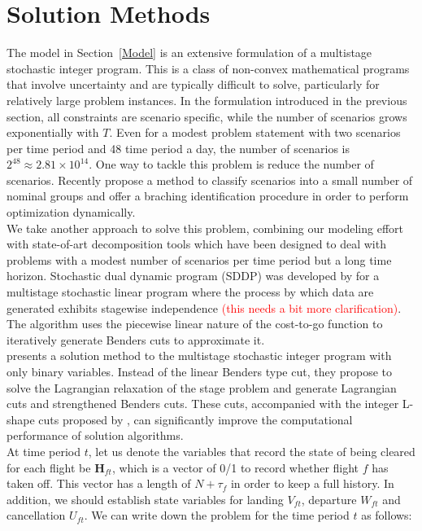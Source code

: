 \documentclass[12pt]{article}
\begin{document}
\section{Solution Methods}
	The model in Section~\ref{Model} is an extensive formulation of a multistage stochastic integer program. This is a class of non-convex mathematical programs that involve uncertainty and are typically difficult to solve, particularly for relatively large problem instances. In the formulation introduced in the previous section, all constraints are scenario specific, while the number of scenarios grows exponentially with \(T\). Even for a modest problem statement with two scenarios per time period and 48 time period a day, the number of scenarios is \(2^{48} \approx 2.81\times 10^{14}\). One way to tackle this problem is reduce the number of scenarios. Recently \cite{liu2008scenario} propose a method to classify scenarios into a small number of nominal groups and offer a braching identification procedure in order to perform optimization dynamically.\\
	\newline
	We take another approach to solve this problem, combining our modeling effort with state-of-art decomposition tools which have been designed to deal with problems with a modest number of scenarios per time period but a long time horizon. Stochastic dual dynamic program (SDDP) was developed by \cite{pereira1991multi} for a multistage stochastic linear program where the process by which data are generated exhibits stagewise independence \textcolor{red}{(this needs a bit more clarification)}. The algorithm uses the piecewise linear nature of the cost-to-go function to iteratively generate Benders cuts to approximate it.\\
	\newline \cite{zou2016nested} presents a solution method to the multistage stochastic integer program with only binary variables. Instead of the linear Benders type cut, they propose to solve the Lagrangian relaxation of the stage problem and generate Lagrangian cuts and strengthened Benders cuts. These cuts, accompanied with the integer L-shape cuts proposed by \cite{laporte1993integer}, can significantly improve the computational performance of solution algorithms.\\
	\newline At time period \(t\), let us denote the variables that record the state of being cleared for each flight be \(\mathbf{H}_{ft}\), which is a vector of 0/1 to record whether flight \(f\) has taken off. This vector has a length of \(N + \tau_f\) in order to keep a full history. In addition, we should establish state variables for landing \(V_{ft}\), departure \(W_{ft}\) and cancellation \(U_{ft}\). We can write down the problem for the time period \(t\) as follows:\\
\end{document}
